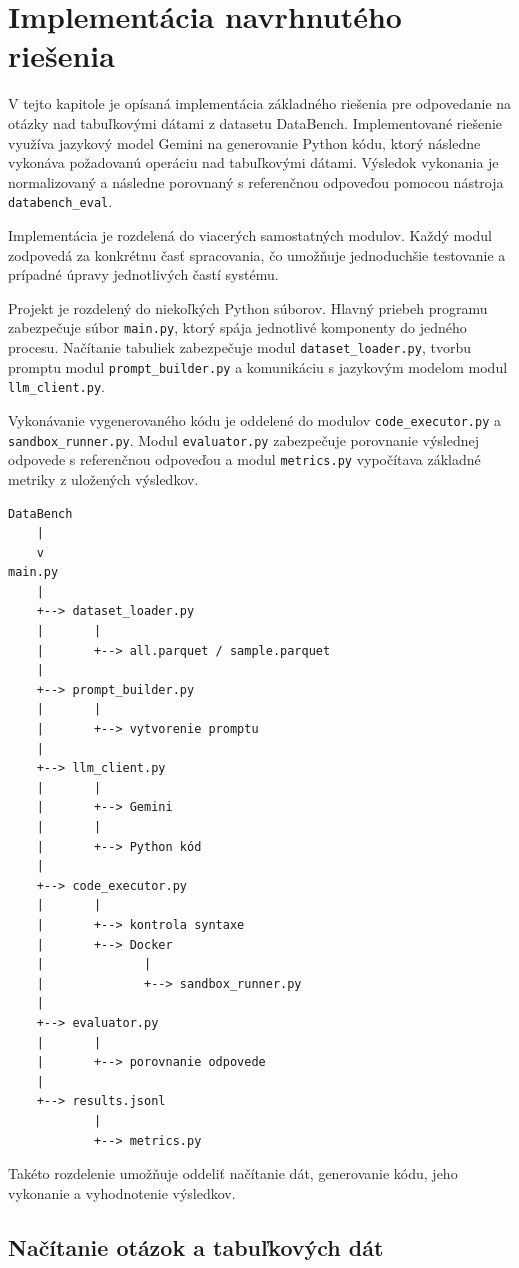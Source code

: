 \section{Implementácia navrhnutého riešenia}

V tejto kapitole je opísaná implementácia základného riešenia pre odpovedanie
na otázky nad tabuľkovými dátami z datasetu DataBench. Implementované riešenie
využíva jazykový model Gemini na generovanie Python kódu, ktorý následne
vykonáva požadovanú operáciu nad tabuľkovými dátami. Výsledok vykonania je
normalizovaný a následne porovnaný s referenčnou odpoveďou pomocou nástroja
\texttt{databench\_eval}.

Implementácia je rozdelená do viacerých samostatných modulov. Každý modul
zodpovedá za konkrétnu časť spracovania, čo umožňuje jednoduchšie testovanie
a prípadné úpravy jednotlivých častí systému.

Projekt je rozdelený do niekoľkých Python súborov. Hlavný priebeh programu
zabezpečuje súbor \texttt{main.py}, ktorý spája jednotlivé komponenty do
jedného procesu. Načítanie tabuliek zabezpečuje modul
\texttt{dataset\_loader.py}, tvorbu promptu modul
\texttt{prompt\_builder.py} a komunikáciu s jazykovým modelom modul
\texttt{llm\_client.py}.

Vykonávanie vygenerovaného kódu je oddelené do modulov
\texttt{code\_executor.py} a \texttt{sandbox\_runner.py}. Modul
\texttt{evaluator.py} zabezpečuje porovnanie výslednej odpovede s referenčnou
odpoveďou a modul \texttt{metrics.py} vypočítava základné metriky z uložených
výsledkov.

\begin{verbatim}
DataBench
    |
    v
main.py
    |
    +--> dataset_loader.py
    |       |
    |       +--> all.parquet / sample.parquet
    |
    +--> prompt_builder.py
    |       |
    |       +--> vytvorenie promptu
    |
    +--> llm_client.py
    |       |
    |       +--> Gemini
    |       |
    |       +--> Python kód
    |
    +--> code_executor.py
    |       |
    |       +--> kontrola syntaxe
    |       +--> Docker
    |              |
    |              +--> sandbox_runner.py
    |
    +--> evaluator.py
    |       |
    |       +--> porovnanie odpovede
    |
    +--> results.jsonl
            |
            +--> metrics.py
\end{verbatim}

Takéto rozdelenie umožňuje oddeliť načítanie dát, generovanie kódu, jeho
vykonanie a vyhodnotenie výsledkov.

\subsection{Načítanie otázok a tabuľkových dát}

